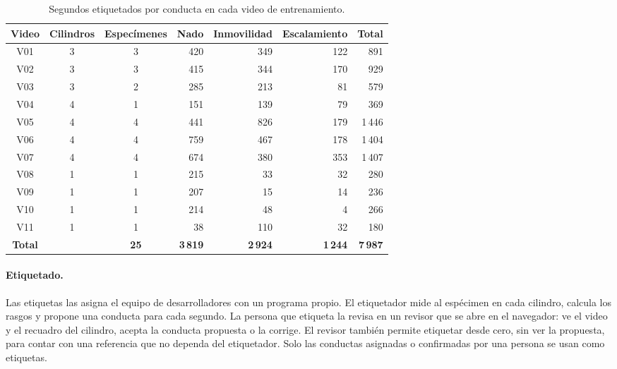 \begin{table}[H]
\centering
\small
\caption{Segundos etiquetados por conducta en cada video de entrenamiento.}
\label{tab:segundos_etiquetados}
\begin{tabular}{|c|c|c|r|r|r|r|}
\hline
\textbf{Video} & \textbf{Cilindros} & \textbf{Especímenes} & \textbf{Nado} & \textbf{Inmovilidad} & \textbf{Escalamiento} & \textbf{Total} \\
\hline
V01 & 3 & 3 & 420 & 349 & 122 & 891 \\
\hline
V02 & 3 & 3 & 415 & 344 & 170 & 929 \\
\hline
V03 & 3 & 2 & 285 & 213 & 81 & 579 \\
\hline
V04 & 4 & 1 & 151 & 139 & 79 & 369 \\
\hline
V05 & 4 & 4 & 441 & 826 & 179 & 1\,446 \\
\hline
V06 & 4 & 4 & 759 & 467 & 178 & 1\,404 \\
\hline
V07 & 4 & 4 & 674 & 380 & 353 & 1\,407 \\
\hline
V08 & 1 & 1 & 215 & 33 & 32 & 280 \\
\hline
V09 & 1 & 1 & 207 & 15 & 14 & 236 \\
\hline
V10 & 1 & 1 & 214 & 48 & 4 & 266 \\
\hline
V11 & 1 & 1 & 38 & 110 & 32 & 180 \\
\hline
\textbf{Total} & & \textbf{25} & \textbf{3\,819} & \textbf{2\,924} & \textbf{1\,244} & \textbf{7\,987} \\
\hline
\end{tabular}
\end{table}

\paragraph{Etiquetado.} Las etiquetas las asigna el equipo de desarrolladores con un programa propio. El etiquetador
mide al espécimen en cada cilindro, calcula los rasgos y propone una conducta para cada segundo. La persona que
etiqueta la revisa en un revisor que se abre en el navegador: ve el video y el recuadro del cilindro, acepta la
conducta propuesta o la corrige. El revisor también permite etiquetar desde cero, sin ver la propuesta, para contar
con una referencia que no dependa del etiquetador. Solo las conductas asignadas o confirmadas por una persona se
usan como etiquetas.

